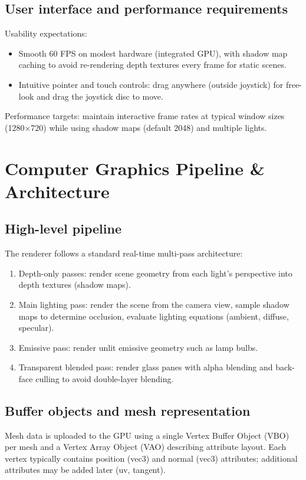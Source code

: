 \documentclass[12pt,a4paper]{report}
\begin{document}
\section{User interface and performance requirements}
Usability expectations:
\begin{itemize}
  \item Smooth 60 FPS on modest hardware (integrated GPU), with shadow map caching to avoid re-rendering depth textures every frame for static scenes.
  \item Intuitive pointer and touch controls: drag anywhere (outside joystick) for free-look and drag the joystick disc to move.
\end{itemize}

Performance targets: maintain interactive frame rates at typical window sizes (1280×720) while using shadow maps (default 2048) and multiple lights.

\chapter{Computer Graphics Pipeline \& Architecture}

\section{High-level pipeline}
The renderer follows a standard real-time multi-pass architecture:
\begin{enumerate}
  \item Depth-only passes: render scene geometry from each light's perspective into depth textures (shadow maps).
  \item Main lighting pass: render the scene from the camera view, sample shadow maps to determine occlusion, evaluate lighting equations (ambient, diffuse, specular).
  \item Emissive pass: render unlit emissive geometry such as lamp bulbs.
  \item Transparent blended pass: render glass panes with alpha blending and back-face culling to avoid double-layer blending.
\end{enumerate}

\section{Buffer objects and mesh representation}
Mesh data is uploaded to the GPU using a single Vertex Buffer Object (VBO) per mesh and a Vertex Array Object (VAO) describing attribute layout. Each vertex typically contains position (vec3) and normal (vec3) attributes; additional attributes may be added later (uv, tangent).
\end{document}
